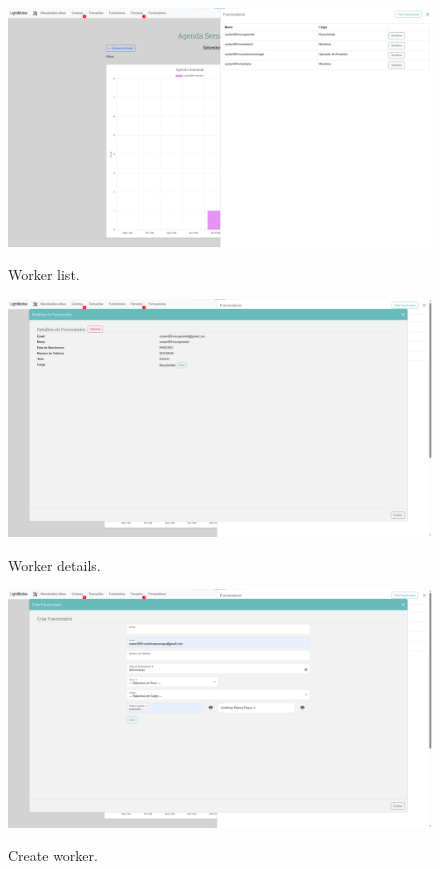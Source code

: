 \begin{figure}[h]
  \caption{Worker list.}
  \centering
  \includegraphics[width=\textwidth]{figs/Implementation/workshopmanager/workerList}
  \label{fig:workerList}
\end{figure}


\begin{figure}[h]
  \caption{Worker details.}
  \centering
  \includegraphics[width=\textwidth]{figs/Implementation/workshopmanager/workerDetails}
  \label{fig:workerDetails}
\end{figure}



\begin{figure}[h]
  \caption{Create worker.}
  \centering
  \includegraphics[width=\textwidth]{figs/Implementation/workshopmanager/workerCreate}
  \label{fig:workerCreate}
\end{figure}


